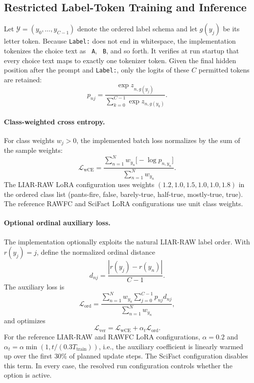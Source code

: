 \subsection{Restricted Label-Token Training and Inference}
\label{sec:supp-label-token}

Let $\mathcal{Y}=(y_0,\ldots,y_{C-1})$ denote the ordered label schema and
let $g(y_j)$ be its letter token.  Because \texttt{Label:} does not end in
whitespace, the implementation tokenizes the choice text as
\texttt{ A}, \texttt{ B}, and so forth.  It verifies at run
startup that every choice text maps to exactly one tokenizer token.
Given the final hidden position after the prompt and \texttt{Label:}, only
the logits of these $C$ permitted tokens are retained:
\begin{equation}
p_{nj} =
\frac{\exp z_{n,g(y_j)}}{\sum_{k=0}^{C-1}\exp z_{n,g(y_k)}}.
\label{eq:supp-restricted-softmax}
\end{equation}

\paragraph{Class-weighted cross entropy.}
For class weights $w_j>0$, the implemented batch loss normalizes by the
sum of the sample weights:
\begin{equation}
\mathcal{L}_{\mathrm{wCE}}
=
\frac{
\sum_{n=1}^{N} w_{y_n}\bigl[-\log p_{n,y_n}\bigr]
}{
\sum_{n=1}^{N} w_{y_n}
}.
\label{eq:supp-weighted-ce}
\end{equation}
The LIAR-RAW LoRA configuration uses weights
$(1.2,1.0,1.5,1.0,1.0,1.8)$ in the ordered class list
(pants-fire, false, barely-true, half-true, mostly-true, true).
The reference RAWFC and SciFact LoRA configurations use unit class weights.

\paragraph{Optional ordinal auxiliary loss.}
The implementation optionally exploits the natural LIAR-RAW label order.
With $r(y_j)=j$, define the normalized ordinal distance
\[
d_{nj}=\frac{|r(y_j)-r(y_n)|}{C-1}.
\]
The auxiliary loss is
\begin{equation}
\mathcal{L}_{\mathrm{ord}}
=
\frac{
\sum_{n=1}^{N}w_{y_n}\sum_{j=0}^{C-1}p_{nj}d_{nj}
}{
\sum_{n=1}^{N}w_{y_n}
},
\label{eq:supp-ordinal}
\end{equation}
and optimizes
\begin{equation}
\mathcal{L}_{\mathrm{ver}}
=
\mathcal{L}_{\mathrm{wCE}}
+\alpha_t\mathcal{L}_{\mathrm{ord}}.
\label{eq:supp-verifier-loss}
\end{equation}
For the reference LIAR-RAW and RAWFC LoRA configurations, $\alpha=0.2$ and
$\alpha_t=\alpha\min(1,t/(0.3T_{\mathrm{train}}))$, i.e., the auxiliary
coefficient is linearly warmed up over the first 30\% of planned update
steps.  The SciFact configuration disables this term.  In every case, the
resolved run configuration controls whether the option is active.


